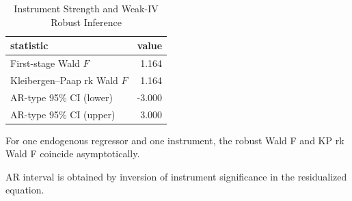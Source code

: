 \begin{table}[!htbp]
\centering
\caption{Instrument Strength and Weak-IV Robust Inference}
\label{tab:iv_first_stage}
\begin{threeparttable}

\begin{tabular}{lr}
\toprule
statistic & value\\
\midrule
First-stage Wald $F$ & 1.164\\
Kleibergen--Paap rk Wald $F$ & 1.164\\
AR-type 95\% CI (lower) & -3.000\\
AR-type 95\% CI (upper) & 3.000\\
\bottomrule
\end{tabular}
\begin{tablenotes}[flushleft]
\footnotesize
\item For one endogenous regressor and one instrument, the robust Wald F and KP rk Wald F coincide asymptotically.
\item AR interval is obtained by inversion of instrument significance in the residualized equation.
\end{tablenotes}
\end{threeparttable}
\end{table}
